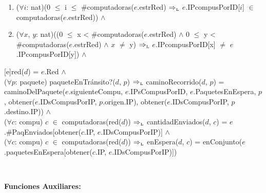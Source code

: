 \begin{Representacion}
{\begin{enumerate}
\item    ($\forall i$: nat)(0 $\leq$ i $\leq$ \#computadoras($e$.estrRed) $\Rightarrow_{\mathrm{\scriptscriptstyle{L}}}$ $e$.IPcompusPorID[$i$] $\in$ computadoras($e$.estrRed)) $\land$ 

\item    ($\forall x$, $y$: nat)((0 $\leq$ x < \#computadoras($e$.estrRed) $\land$ 0 $\leq$ y < \#computadoras($e$.estrRed) $\land$ $x$ $\neq$ y) $\Rightarrow_{\mathrm{\scriptscriptstyle{L}}}$ $e$.IPcompusPorID[x] $\neq$ $e$.IPcompusPorID[y]) $\land$ 


    \end{enumerate} 
    
    }\mbox{} %

\pagebreak

[e]{red($d$) = $e$.Red $\land$ \\

  ($\forall p$: paquete) paqueteEnTr\'ansito?($d$, $p$) $\Rightarrow_{\mathrm{\scriptscriptstyle{L}}}$ caminoRecorrido($d$, $p$) = caminoDelPaquete($e$.siguienteCompu, $e$.IPsCompusPorID, $e$.PaquetesEnEspera, $p$, obtener($e$.IDsCompusPorIP, $p$.origen.IP), obtener($e$.IDsCompusPorIP, $p$.destino.IP)) $\land$ \\

  ($\forall c$: compu) $c$ $\in$ computadoras(red($d$)) $\Rightarrow_{\mathrm{\scriptscriptstyle{L}}}$ cantidadEnviados($d$, $c$) = $e$.\#PaqEnviados[obtener($c$.IP, $e$.IDsCompusPorIP)] $\land$ \\

  ($\forall c$: compu) $c$ $\in$ computadoras(red($d$)) $\Rightarrow_{\mathrm{\scriptscriptstyle{L}}}$ enEspera($d$, $c$) = enConjunto($e$.paquetesEnEspera[obtener($c$.IP, $e$.IDsCompusPorIP)])
}

  ~

  \textbf{Funciones Auxiliares:}

  ~




\end{Representacion}
